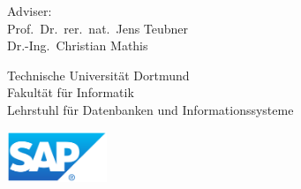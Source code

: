 \hspace*{\links}
\begin{minipage}[b]{6cm}
\normalsize
\normalfont
\raggedright
Adviser: \\
Prof.\ Dr.\ rer.\ nat.\ Jens Teubner\\
Dr.-Ing.\ Christian Mathis\\
\end{minipage}

\vspace*{2.5cm}
\hspace*{\links}
\begin{minipage}[b]{8cm}
\normalsize
\normalfont
\raggedright
Technische Universität Dortmund\\
Fakultät für Informatik\\
Lehrstuhl für Datenbanken und Informationssysteme
\end{minipage}
\begin{minipage}{8cm}
\hspace{2cm}\vspace{2cm}
\includegraphics[width=3cm]{images/SAP_2011_Logo}
\end{minipage}
